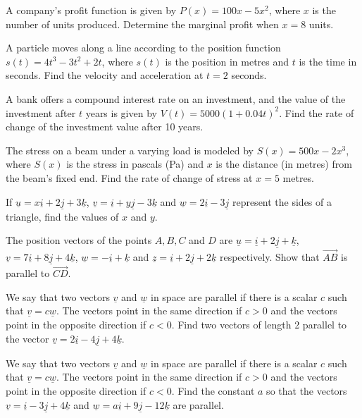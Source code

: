 \documentclass[11pt,a4paper]{article}
\begin{document}
\begin{longlist}
\item A company's profit function is given by $P(x)=100x-5x^2$, where $x$ is the number of units produced. Determine the marginal profit when $x=8$ units.

\item A particle moves along a line according to the position function $s(t)=4t^3-3t^2+2t$, where $s(t)$ is the position in metres and $t$ is the time in seconds. Find the velocity and acceleration at $t=2$ seconds.

\item A bank offers a compound interest rate on an investment, and the value of the investment after $t$ years is given by $V(t)=5000(1+0.04t)^2$. Find the rate of change of the investment value after 10 years.

\item The stress on a beam under a varying load is modeled by $S(x)=500x-2x^3$, where $S(x)$ is the stress in pascals (Pa) and $x$ is the distance (in metres) from the beam's fixed end. Find the rate of change of stress at $x=5$ metres.

\item If $\underline{u}= x\underline{i} + 2\underline{j} + 3\underline{k}$, $\underline{v}=\underline{i}+y\underline{j}-3\underline{k}$ and $\underline{w}=2\underline{i}-3\underline{j}$ represent the sides of a triangle, find the values of $x$ and $y$.

\item The position vectors of the points $A,B,C$ and $D$ are $\underline{u}=\underline{i}+2\underline{j}+\underline{k}$, $\underline{v}=7\underline{i}+8\underline{j}+4\underline{k}$, $\underline{w}=-\underline{i}+\underline{k}$ and $\underline{z}=\underline{i}+2\underline{j}+2\underline{k}$ respectively. Show that $\overrightarrow{AB}$ is parallel to $\overrightarrow{CD}$.

\item We say that two vectors $\underline{v}$ and $\underline{w}$ in space are parallel if there is a scalar $c$ such that $\underline{v}=c\underline{w}$. The vectors point in the same direction if $c>0$ and the vectors point in the opposite direction if $c<0$. Find two vectors of length 2 parallel to the vector $\underline{v}=2\underline{i}-4\underline{j}+4\underline{k}$.

\item We say that two vectors $\underline{v}$ and $\underline{w}$ in space are parallel if there is a scalar $c$ such that $\underline{v}=c\underline{w}$. The vectors point in the same direction if $c>0$ and the vectors point in the opposite direction if $c<0$. Find the constant $a$ so that the vectors $\underline{v}=\underline{i}-3\underline{j}+4\underline{k}$ and $\underline{w}=a\underline{i}+9\underline{j}-12\underline{k}$ are parallel.


\end{longlist}
\end{document}
